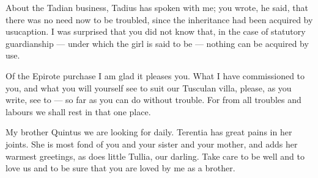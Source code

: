  About the Tadian business, Tadius has spoken with me; you wrote, he said, that there was no need now to be troubled, since the inheritance had been acquired by usucaption. I was surprised that you did not know that, in the case of statutory guardianship --- under which the girl is said to be --- nothing can be acquired by use.

 Of the Epirote purchase I am glad it pleases you. What I have commissioned to you, and what you will yourself see to suit our Tusculan villa, please, as you write, see to --- so far as you can do without trouble. For from all troubles and labours we shall rest in that one place.

 My brother Quintus we are looking for daily. Terentia has great pains in her joints. She is most fond of you and your sister and your mother, and adds her warmest greetings, as does little Tullia, our darling. Take care to be well and to love us and to be sure that you are loved by me as a brother.
